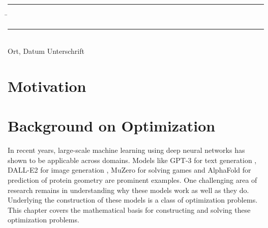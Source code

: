 \documentclass[12pt]{article}
\theoremstyle{definition}
\numberwithin{equation}{section}
\begin{document}
\vspace*{3em}

\begin{tabbing}
  \rule{.4\textwidth}{1pt} \hspace*{.2\textwidth}
  \= \rule{.4\textwidth}{1pt} \\
  Ort, Datum \> Unterschrift
\end{tabbing}

\newpage
\mbox{}
\newpage
\tableofcontents
\newpage
\listoffigures
\newpage
\printnomenclature
\newpage
\section{Motivation}
\label{sec:Motivation}
\section{Background on Optimization}
\label{sec:Optimization}
In recent years, large-scale machine learning using deep neural networks has shown to be applicable across domains. Models like GPT-3 for text generation \autocite{brownLanguageModelsAre2020}, DALL-E2 for image generation \autocite{rameshHierarchicalTextConditionalImage2022}, MuZero for solving games \autocite{schrittwieserMasteringAtariGo2020} and AlphaFold for prediction of protein geometry \autocite{jumperHighlyAccurateProtein2021} are prominent examples.
One challenging area of research remains in understanding why these models work as well as they do. Underlying the construction of these models is a class of optimization problems. This chapter covers the mathematical basis for constructing and solving these optimization problems.
\end{document}
